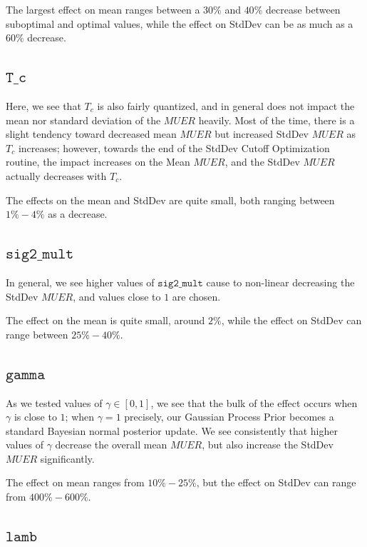 The largest effect on mean ranges between a $30\%$ and $40\%$ decrease between suboptimal and optimal values, while the effect on StdDev can be as much as a $60\%$ decrease.

\subsection{$\mathtt{T\_c}$}

Here, we see that $T_c$ is also fairly quantized, and in general does not impact the mean nor standard deviation of the $MUER$ heavily.  Most of the time, there is a slight tendency toward decreased mean $MUER$ but increased StdDev $MUER$ as $T_c$ increases; however, towards the end of the StdDev Cutoff Optimization routine, the impact increases on the Mean $MUER$, and the StdDev $MUER$ actually decreases with $T_c$.

The effects on the mean and StdDev are quite small, both ranging between $1\%-4\%$ as a decrease.

\subsection{$\mathtt{sig2\_mult}$}

In general, we see higher values of $\mathtt{sig2\_mult}$ cause to non-linear decreasing the StdDev $MUER$, and values close to $1$ are chosen.

The effect on the mean is quite small, around $2\%$, while the effect on StdDev can range between $25\% - 40\%$.

\subsection{$\mathtt{gamma}$}

As we tested values of $\gamma \in [0,1]$, we see that the bulk of the effect occurs when $\gamma$ is close to $1$; when $\gamma = 1$ precisely, our Gaussian Process Prior becomes a standard Bayesian normal posterior update.  We see consistently that higher values of $\gamma$ decrease the overall mean $MUER$, but also increase the StdDev $MUER$ significantly.

The effect on mean ranges from $10\% - 25\%$, but the effect on StdDev can range from $400\%-600\%$.

\subsection{$\mathtt{lamb}$}

